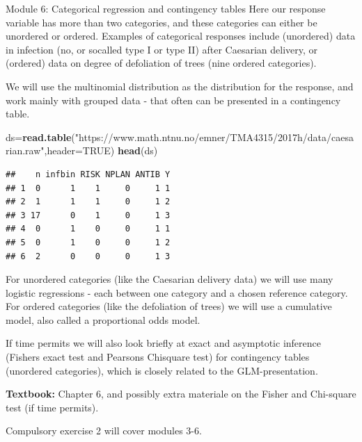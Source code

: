 \documentclass[
  ignorenonframetext,
]{beamer}
\newenvironment{Shaded}{\begin{snugshade}}{\end{snugshade}}
\newcommand{\AttributeTok}[1]{\textcolor[rgb]{0.13,0.29,0.53}{#1}}
\newcommand{\ConstantTok}[1]{\textcolor[rgb]{0.56,0.35,0.01}{#1}}
\newcommand{\FunctionTok}[1]{\textcolor[rgb]{0.13,0.29,0.53}{\textbf{#1}}}
\newcommand{\NormalTok}[1]{#1}
\newcommand{\OtherTok}[1]{\textcolor[rgb]{0.56,0.35,0.01}{#1}}
\newcommand{\StringTok}[1]{\textcolor[rgb]{0.31,0.60,0.02}{#1}}
\begin{document}
\begin{frame}[fragile]
\begin{block}{Module 6: Categorical regression and contingency tables}
\protect\hypertarget{module-6-categorical-regression-and-contingency-tables}{}
Here our response variable has more than two categories, and these
categories can either be unordered or ordered. Examples of categorical
responses include (unordered) data in infection (no, or socalled type I
or type II) after Caesarian delivery, or (ordered) data on degree of
defoliation of trees (nine ordered categories).

We will use the multinomial distribution as the distribution for the
response, and work mainly with grouped data - that often can be
presented in a contingency table.

\tiny

\begin{Shaded}
\begin{Highlighting}[]
\NormalTok{ds}\OtherTok{=}\FunctionTok{read.table}\NormalTok{(}\StringTok{"https://www.math.ntnu.no/emner/TMA4315/2017h/data/caesarian.raw"}\NormalTok{,}\AttributeTok{header=}\ConstantTok{TRUE}\NormalTok{)}
\FunctionTok{head}\NormalTok{(ds)}
\end{Highlighting}
\end{Shaded}

\begin{verbatim}
##    n infbin RISK NPLAN ANTIB Y
## 1  0      1    1     0     1 1
## 2  1      1    1     0     1 2
## 3 17      0    1     0     1 3
## 4  0      1    0     0     1 1
## 5  0      1    0     0     1 2
## 6  2      0    0     0     1 3
\end{verbatim}

\normalsize
\end{block}
\end{frame}

\begin{frame}
For unordered categories (like the Caesarian delivery data) we will use
many logistic regressions - each between one category and a chosen
reference category. For ordered categories (like the defoliation of
trees) we will use a cumulative model, also called a proportional odds
model.
\end{frame}

\begin{frame}
If time permits we will also look briefly at exact and asymptotic
inference (Fishers exact test and Pearsons Chisquare test) for
contingency tables (unordered categories), which is closely related to
the GLM-presentation.

\textbf{Textbook:} Chapter 6, and possibly extra materiale on the Fisher
and Chi-square test (if time permits).

Compulsory exercise 2 will cover modules 3-6.
\end{frame}
\end{document}
